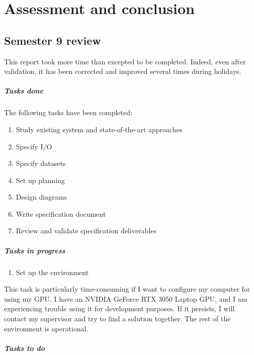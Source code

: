 \documentclass{polytech/polytech}
\numberwithin{figure}{chapter}
\begin{document}
\chapter{Assessment and conclusion}

\section{Semester 9 review}

This report took more time than excepted to be completed.
Indeed, even after validation, it has been corrected and improved several times during holidays.

\paragraph{Tasks done}

The following tasks have been completed:
\begin{enumerate}
\item Study existing system and state-of-the-art approaches
\item Specify I/O
\item Specify datasets
\item Set up planning
\item Design diagrams
\item Write specification document
\item Review and validate specification deliverables
\end{enumerate}

\paragraph{Tasks in progress}

\begin{enumerate}
\item Set up the environment
\end{enumerate}

This task is particularly time-consuming if I want to configure my computer for using my GPU.
I have an NVIDIA GeForce RTX 3050 Laptop GPU, and I am experiencing trouble using it for development purposes.
If it persists, I will contact my supervisor and try to find a solution together.
The rest of the environment is operational.

\paragraph{Tasks to do}
\end{document}
